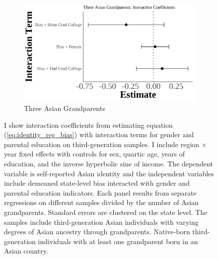 \begin{center}
\begin{figure}[!htb]
\begin{subfigure}{.45\textwidth}
\caption{Three Asian Grandparents}
\centering
\includegraphics[width=1\linewidth]{interaction_coefficients_ThreeAsian.png}
\end{subfigure}

\caption*{\footnotesize{I show interaction coefficients from estimating equation (\ref{eq:identity_reg_bias}) with interaction terms for gender and parental education on third-generation samples. I include region $\times$ year fixed effects with controls for sex, quartic age, years of education, and the inverse hyperbolic sine of income. The dependent variable is self-reported Asian identity and the independent variables include demeaned state-level bias interacted with gender and parental education indicators. Each panel results from separate regressions on different samples divided by the number of Asian grandparents. Standard errors are clustered on the state level. The samples include third-generation Asian individuals with varying degrees of Asian ancestry through grandparents. Native-born third-generation individuals with at least one grandparent born in an Asian country.}}
\end{figure}
\end{center}

\pagebreak
\newpage

